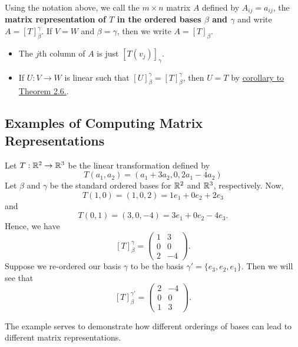 \begin{definition}
    Using the notation above, we call the \( m \times n  \) matrix \( A  \) defined by \( {A}_{ij} = {a}_{ij} \), the \textbf{matrix representation of \( T  \) in the ordered bases \( \beta  \) and \( \gamma \) } and write \( A = {[T]}_{\beta}^{\gamma}  \). If \( V = W  \) and \( \beta = \gamma  \), then we write \( A = [T]_{\beta}^{}  \).
\end{definition}

\begin{itemize}
    \item The \( j \)th column of \( A  \) is just \( {[T({v}_{j})]}_{\gamma} \). 
    \item If \( U: V \to W  \) is linear such that \( {[U]}_{\beta}^{\gamma} = [T]_{\beta}^{\gamma}  \), then \( U = T  \) by {\hyperref[Theorem 2.6]{corollary to Theorem 2.6.}}.
\end{itemize}

\subsection{Examples of Computing Matrix Representations}

\begin{eg}
   Let \( T: \mathbb{R}^{2} \to \mathbb{R}^{3}  \) be the linear transformation defined by  
   \[  T({a}_{1}, {a}_{2}) = ({a}_{1} + {3a}_{2}, 0 , {2a}_{1} - {4a}_{2}) \] 
   Let \(  \beta  \) and \( \gamma  \) be the standard ordered bases for \( \mathbb{R}^{2}  \) and \( \mathbb{R}^{3}  \), respectively. Now, 
   \[  T(1,0) = (1,0,2) = {1e}_{1} + {0e}_{2} + {2e}_{3}  \]
    and 
    \[  T(0,1) = (3,0,-4) = {3e}_{1} + {0e}_{2} - {4e}_{3}. \]
    Hence, we have
    \[  [T]_{\beta}^{\gamma}  = \begin{pmatrix}
        1 & 3 \\
        0 & 0 \\
        2 & -4
    \end{pmatrix}. \]
    Suppose we re-ordered our basis \( \gamma \) to be the basis \( \gamma' = \{ {e}_{3} , {e}_{2}, {e}_{1} \}  \). Then we will see that
    \[  [T]_{\beta}^{\gamma'} = \begin{pmatrix}
        2 & -4 \\ 
        0 & 0 \\ 
        1 & 3 
    \end{pmatrix}.  \]
\end{eg}

The example serves to demonstrate how different orderings of bases can lead to different matrix representations.

